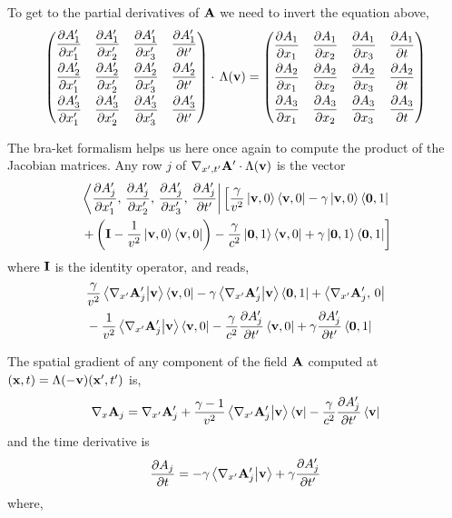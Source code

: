 \documentclass[12pt]{article}
\newcommand{\ds}{\displaystyle}
\begin{document}
To get to the partial derivatives of $\vb{A}$ we need to invert the equation above,
\[
  \begin{pmatrix}
    \ds\pdv{A'_1}{x'_1} & \ds\pdv{A'_1}{x'_2} & \ds\pdv{A'_1}{x'_3} & \ds\pdv{A'_1}{t'} \\[8pt]
    \ds\pdv{A'_2}{x'_1} & \ds\pdv{A'_2}{x'_2} & \ds\pdv{A'_2}{x'_3} & \ds\pdv{A'_2}{t'} \\[8pt]
    \ds\pdv{A'_3}{x'_1} & \ds\pdv{A'_3}{x'_2} & \ds\pdv{A'_3}{x'_3} & \ds\pdv{A'_3}{t'}
  \end{pmatrix}
  \cdot\,\Lambda(\vb{v})
  =
  \begin{pmatrix}
    \ds\pdv{A_1}{x_1} & \ds\pdv{A_1}{x_2} & \ds\pdv{A_1}{x_3} & \ds\pdv{A_1}{t} \\[8pt]
    \ds\pdv{A_2}{x_1} & \ds\pdv{A_2}{x_2} & \ds\pdv{A_2}{x_3} & \ds\pdv{A_2}{t} \\[8pt]
    \ds\pdv{A_3}{x_1} & \ds\pdv{A_3}{x_2} & \ds\pdv{A_3}{x_3} & \ds\pdv{A_3}{t}
  \end{pmatrix}
\]

The bra-ket formalism helps us here once again to compute the product of the Jacobian
matrices. Any row $j$ of $\nabla_{x',t'}\vb{A}' \cdot \Lambda(\vb{v})$ is the vector
\[
  \begin{aligned}
    &\bra{\ds\pdv{A'_j}{x'_1},\, \ds\pdv{A'_j}{x'_2},\, \ds\pdv{A'_j}{x'_3},\, \ds\pdv{A'_j}{t'}}
    \left[
      \frac{\gamma}{v^2}\ket{\vb{v},0}\bra{\vb{v},0}
      - \gamma\ket{\vb{v},0}\bra{\vb{0},1} \right.\\
    &\left.
      + \left(\vb{I} - \frac{1}{v^2}\ket{\vb{v},0}\bra{\vb{v},0}\right)
      - \frac{\gamma}{c^2}\ket{\vb{0},1}\bra{\vb{v},0}
      + \gamma\ket{\vb{0},1}\bra{\vb{0},1}
    \right]
  \end{aligned}
\]
where $\vb{I}$ is the identity operator, and reads,
\[
  \begin{aligned}
    &\frac{\gamma}{v^2}\ip{\nabla_{x'}\vb{A}'_j}{\vb{v}}\bra{\vb{v},0}
    - \gamma\ip{\nabla_{x'}\vb{A}'_j}{\vb{v}}\bra{\vb{0},1}
    + \bra{\nabla_{x'}\vb{A}'_j,\,0} \\
    &- \frac{1}{v^2}\ip{\nabla_{x'}\vb{A}'_j}{\vb{v}}\bra{\vb{v},0}
    - \frac{\gamma}{c^2}\ds\pdv{A'_j}{t'}\bra{\vb{v},0}
    + \gamma\ds\pdv{A'_j}{t'}\bra{\vb{0},1}
  \end{aligned}
\]

The spatial gradient of any component of the field $\vb{A}$ computed at
$(\vb{x},t) = \Lambda(-\vb{v})(\vb{x}',t')$ is,
\begin{equation}
  \nabla_x \vb{A}_j = \nabla_{x'}\vb{A}'_j
    + \frac{\gamma-1}{v^2}\ip{\nabla_{x'}\vb{A}'_j}{\vb{v}}\bra{\vb{v}}
    - \frac{\gamma}{c^2}\ds\pdv{A'_j}{t'}\bra{\vb{v}}
  \label{eq:gradient_in_F}
\end{equation}
and the time derivative is
\begin{equation}
  \pdv{A_j}{t} = -\gamma\ip{\nabla_{x'}\vb{A}'_j}{\vb{v}} + \gamma\pdv{A'_j}{t'}
  \label{eq:time_derivative_in_F}
\end{equation}
where,
\end{document}
